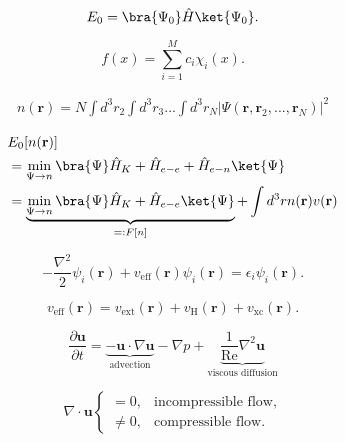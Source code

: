 \begin{equation}

E_0 = \bra{\Psi_0} \hat{H} \ket{\Psi_0}.
\end{equation}

\begin{equation}

f(x) = \sum_{i=1}^{M}c_{i}\chi_{i}(x).
\end{equation}

\begin{gather}

n(\mathbf{r}) = N \int d^3 r_2 \int d^3 r_3 ... \int d^3 r_N \vert\Psi(\mathbf{r}, \mathbf{r}_2, ..., \mathbf{r}_N)\vert^2
\end{gather}

\begin{align}
\label{HK}
&E_0[n(\mathbf{r})] \nonumber\\
&= \min_{\Psi \to n} \bra{\Psi} \hat{H}_K + \hat{H}_{e-e} + \hat{H}_{e-n} \ket{\Psi} \\
&= \underbrace{\min_{\Psi \to n} \bra{\Psi} \hat{H}_K + \hat{H}_{e-e} \ket{\Psi}}_{=: F[n]} + \int d^3 r n(\mathbf{r}) v(\mathbf{r})
\end{align}

\begin{equation}

-\frac{\nabla^2}{2} \psi_i(\mathbf{r}) + v_{\text{eff}}(\mathbf{r})\psi_i(\mathbf{r}) = \epsilon_i \psi_i(\mathbf{r}).
\end{equation}

\begin{equation}

v_{\text{eff}}(\mathbf{r}) = v_{\text{ext}}(\mathbf{r}) + v_{\text{H}}(\mathbf{r}) + v_{\text{xc}}(\mathbf{r}).
\end{equation}

\begin{equation}
\label{eq:navierstokes}
\frac{\partial\mathbf{u}}{\partial t} = \underbrace{-\mathbf{u}\cdot\nabla\mathbf{u}}_\text{advection} - \nabla p + \underbrace{\frac{1}{\text{Re}}\nabla^2\mathbf{u}}_\text{viscous diffusion}
\end{equation}

\begin{equation}

\nabla\cdot\mathbf{u}
\begin{cases}
= 0, & \text{incompressible flow,} \\
\neq 0, & \text{compressible flow.} 
\end{cases}
\end{equation}

